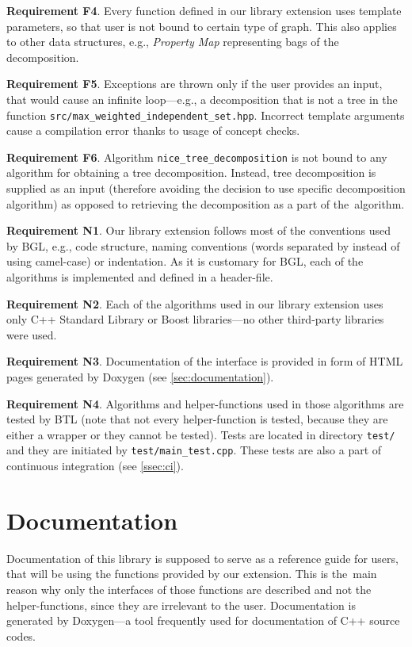 \documentclass[thesis=B,english]{FITthesis}[2019/03/21]
\begin{document}
\noindent\textbf{Requirement F4}. Every function defined in our library extension uses template parameters, so that user is not bound to certain type of graph. This also applies to other data structures, e.g., \emph{Property Map} representing bags of the decomposition.\bigskip

\noindent\textbf{Requirement F5}. Exceptions are thrown only if the user provides an input, that would cause an infinite loop---e.g., a decomposition that is not a tree in the function \texttt{src/max\_weighted\_independent\_set.hpp}. Incorrect template arguments cause a compilation error thanks to usage of concept checks.\bigskip

\noindent\textbf{Requirement F6}. Algorithm \texttt{nice\_tree\_decomposition} is not bound to any algorithm for obtaining a tree decomposition. Instead, tree decomposition is supplied as an input (therefore avoiding the decision to use specific decomposition algorithm) as opposed to retrieving the decomposition as a part of the~algorithm.\bigskip

\noindent\textbf{Requirement N1}. Our library extension follows most of the conventions used by BGL, e.g., code structure, naming conventions (words separated by \uv{\_} instead of using camel-case) or indentation. As it is customary for BGL, each of the algorithms is implemented and defined in a header-file.\bigskip

\noindent\textbf{Requirement N2}. Each of the algorithms used in our library extension uses only C++ Standard Library or Boost libraries---no other third-party libraries were used.\bigskip

\noindent\textbf{Requirement N3}. Documentation of the interface is provided in form of HTML pages generated by Doxygen (see \autoref{sec:documentation}).\bigskip

\noindent\textbf{Requirement N4}. Algorithms and helper-functions used in those algorithms are tested by BTL (note that not every helper-function is tested, because they are either a wrapper or they cannot be tested). Tests are located in directory \texttt{test/} and they are initiated by \texttt{test/main\_test.cpp}. These tests are also a part of continuous integration (see \autoref{ssec:ci}).
\section{Documentation}\label{sec:documentation}
Documentation of this library is supposed to serve as a reference guide for users, that will be using the functions provided by our extension. This is the~main reason why only the interfaces of those functions are described and not the helper-functions, since they are irrelevant to the user. Documentation is generated by Doxygen---a tool frequently used for documentation of C++ source codes.
\end{document}
